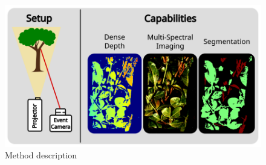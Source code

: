 \begin{figure}[t!]
    \centering
    \includegraphics[width=.8 \textwidth]{chapters/papers/ED/resources/images/overview.png}
    \caption{Method description}
    \label{fig:method_overview}
\end{figure}